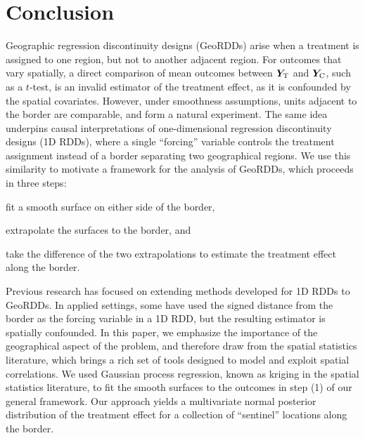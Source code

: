 \documentclass[12pt]{article}
\begin{document}
\section{Conclusion}

Geographic regression discontinuity designs (GeoRDDs) arise when a treatment is assigned to one region, but not to another adjacent region.
For outcomes that vary spatially, a direct comparison of mean outcomes between \(\bm{Y}_{\mathrm{T}}\) and \(\bm{Y}_{\mathrm{C}}\), such as a \(t\)-test, is an invalid estimator of the treatment effect, as it is confounded by the spatial covariates.
However, under smoothness assumptions, units adjacent to the border are comparable, and form a natural experiment.
The same idea underpins causal interpretations of one-dimensional regression discontinuity designs (1D RDDs), where a single ``forcing'' variable controls the treatment assignment instead of a border separating two geographical regions.
We use this similarity to motivate a framework for the analysis of GeoRDDs, which proceeds in three steps:
\begin{flatlist} 
\item fit a smooth surface on either side of the border,
\item extrapolate the surfaces to the border, and 
\item take the difference of the two extrapolations to estimate the treatment effect along the border.
\end{flatlist}

Previous research has focused on extending methods developed for 1D RDDs to GeoRDDs.
In applied settings, some have used the signed distance from the border as the forcing variable in a 1D RDD, but the resulting estimator is spatially confounded.
In this paper, we emphasize the importance of the geographical aspect of the problem, and therefore draw from the spatial statistics literature, which brings a rich set of tools designed to model and exploit spatial correlations.
We used Gaussian process regression, known as kriging in the spatial statistics literature, to fit the smooth surfaces to the outcomes in step (1) of our general framework.
Our approach yields a multivariate normal posterior distribution of the treatment effect for a collection of ``sentinel'' locations along the border.
\end{document}
